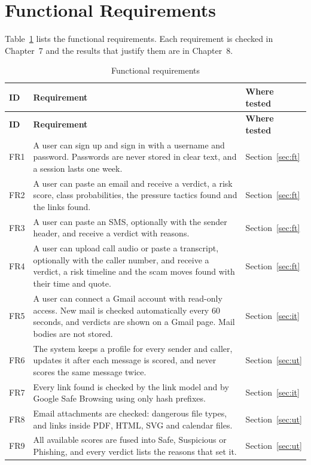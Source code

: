 {\section{Functional Requirements}
Table~\ref{tab:fr} lists the functional requirements. Each requirement is checked in Chapter~7 and the results that justify them are in Chapter~8.

{\small{}
\begin{longtable}{|p{1.2cm}|p{10.6cm}|p{2.6cm}|}
\caption{Functional requirements}\label{tab:fr}\\
\hline \textbf{ID} & \textbf{Requirement} & \textbf{Where tested} \\ \hline
\endfirsthead
\hline \textbf{ID} & \textbf{Requirement} & \textbf{Where tested} \\ \hline
\endhead
\hline
\endfoot
FR1 & A user can sign up and sign in with a username and password. Passwords are never stored in clear text, and a session lasts one week. & Section~\ref{sec:ft} \\ \hline
FR2 & A user can paste an email and receive a verdict, a risk score, class probabilities, the pressure tactics found and the links found. & Section~\ref{sec:ft} \\ \hline
FR3 & A user can paste an SMS, optionally with the sender header, and receive a verdict with reasons. & Section~\ref{sec:ft} \\ \hline
FR4 & A user can upload call audio or paste a transcript, optionally with the caller number, and receive a verdict, a risk timeline and the scam moves found with their time and quote. & Section~\ref{sec:ft} \\ \hline
FR5 & A user can connect a Gmail account with read-only access. New mail is checked automatically every 60 seconds, and verdicts are shown on a Gmail page. Mail bodies are not stored. & Section~\ref{sec:it} \\ \hline
FR6 & The system keeps a profile for every sender and caller, updates it after each message is scored, and never scores the same message twice. & Section~\ref{sec:ut} \\ \hline
FR7 & Every link found is checked by the link model and by Google Safe Browsing using only hash prefixes. & Section~\ref{sec:it} \\ \hline
FR8 & Email attachments are checked: dangerous file types, and links inside PDF, HTML, SVG and calendar files. & Section~\ref{sec:ut} \\ \hline
FR9 & All available scores are fused into Safe, Suspicious or Phishing, and every verdict lists the reasons that set it. & Section~\ref{sec:ut} \\ \hline

\end{longtable}}}
